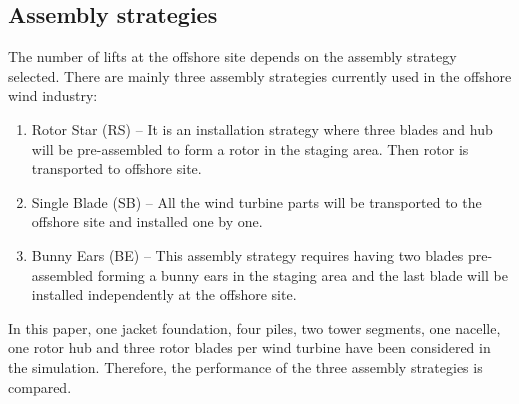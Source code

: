 \subsection{Assembly strategies}
The number of lifts at the offshore site depends on the assembly strategy selected. There are mainly three assembly strategies currently used in the offshore wind industry:

\begin{enumerate}
\item Rotor Star (RS) -- It is an installation strategy where three blades and hub will be pre-assembled to form a rotor in the staging area. Then rotor is transported to offshore site.
\item Single Blade (SB) -- All the wind turbine parts will be transported to the offshore site and installed one by one.
\item Bunny Ears (BE) -- This assembly strategy requires having two blades pre-assembled forming a bunny ears in the staging area and the last blade will be installed independently at the offshore site.
\end{enumerate}

In this paper, one jacket foundation, four piles, two tower segments, one nacelle, one rotor hub and three rotor blades per wind turbine have been considered in the simulation. Therefore, the performance of the three assembly strategies is compared.